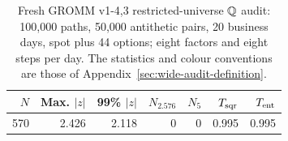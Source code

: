 \begin{table}[H]
\centering\small
\begin{tabular}{rrrrrrr}
\toprule
$N$ & Max. $|z|$ & 99\% $|z|$ & $N_{2.576}$ & $N_5$ & $T_{\rm sqr}$ & $T_{\rm ent}$ \\
\midrule
570 & 2.426 & 2.118 & 0 & 0 & 0.995 & 0.995 \\
\bottomrule
\end{tabular}
\caption{Fresh GROMM v1-4,3 restricted-universe $\mathbb Q$ audit: 100,000 paths, 50,000 antithetic pairs, 20 business days, spot plus 44 options; eight factors and eight steps per day. The statistics and colour conventions are those of Appendix~\ref{sec:wide-audit-definition}.}
\label{tab:wide-q-audit}
\end{table}
